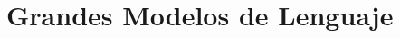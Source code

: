 \documentclass{book}
\begin{document}
\chapter{Grandes Modelos de Lenguaje}
\label{cap_llm}








\end{document}
